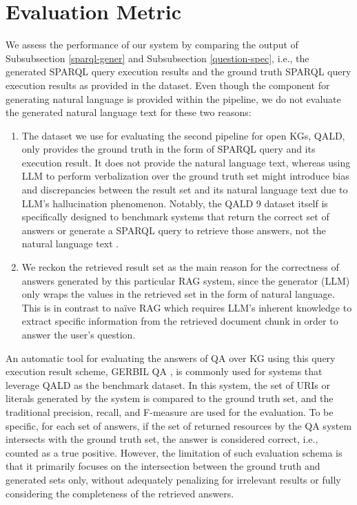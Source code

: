 \section{Evaluation Metric}
\label{jaccard}
We assess the performance of our system by comparing the output of Subsubsection \ref{sparql-gener} and Subsubsection \ref{question-spec}, i.e., the generated SPARQL query execution results and the ground truth SPARQL query execution results as provided in the dataset.
Even though the component for generating natural language is provided within the pipeline, we do not evaluate the generated natural language text for these two reasons: 
\begin{enumerate}
    \item The dataset we use for evaluating the second pipeline for open KGs, 
    QALD, only provides the ground truth in the form of SPARQL query and its 
    execution result. It does not provide the natural language text, whereas using 
    LLM to perform verbalization over the ground truth set might introduce bias
    and discrepancies between the result set and its natural language text due
    to LLM's hallucination phenomenon. Notably, the QALD 9 dataset itself is 
    specifically designed to benchmark systems that return the correct set 
    of answers or generate a SPARQL query to retrieve those 
    answers, not the natural language text \citep{Usbeck20189thCO}.
    \item We reckon the retrieved result set as the main reason for the 
    correctness of answers generated by this particular RAG system, since
    the generator (LLM) only wraps the values in the retrieved set in the form
    of natural language. This is in contrast to na\"{i}ve RAG which requires
    LLM's inherent knowledge to extract specific information from the
    retrieved document chunk in order to answer the user's question.
\end{enumerate}

An automatic tool for evaluating the answers of QA over KG using this query execution result scheme, GERBIL QA 
\citep{benchmarkqald}, is commonly used for systems that leverage QALD
as the benchmark dataset. In this system, the set of URIs or literals
generated by the system is compared to the ground truth set, and the
traditional precision, recall, and F-measure are used for the
evaluation. To be specific, for each set of answers, if the set of
returned resources by the QA system intersects with the ground truth set,
the answer is considered correct, i.e., counted as a true positive.
However, the limitation of such evaluation schema is that it primarily
focuses on the intersection between the ground truth and generated sets only,
without adequately penalizing for irrelevant results or fully considering
the completeness of the retrieved answers.

